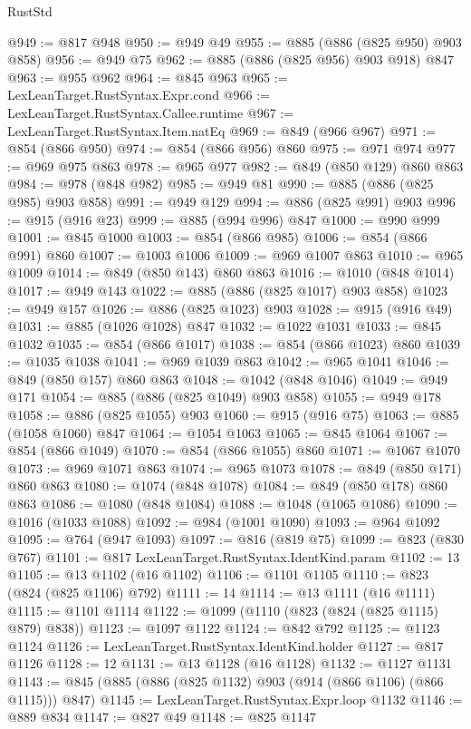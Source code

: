 \begin{lexlean}{RustStd}
\begin{coremodule}
@949 := @817 @948
@950 := @949 @49
@955 := @885 (@886 (@825 @950) @903 @858)
@956 := @949 @75
@962 := @885 (@886 (@825 @956) @903 @918) @847
@963 := @955 @962
@964 := @845 @963
@965 := LexLeanTarget.RustSyntax.Expr.cond
@966 := LexLeanTarget.RustSyntax.Callee.runtime
@967 := LexLeanTarget.RustSyntax.Item.natEq
@969 := @849 (@966 @967)
@971 := @854 (@866 @950)
@974 := @854 (@866 @956) @860
@975 := @971 @974
@977 := @969 @975 @863
@978 := @965 @977
@982 := @849 (@850 @129) @860 @863
@984 := @978 (@848 @982)
@985 := @949 @81
@990 := @885 (@886 (@825 @985) @903 @858)
@991 := @949 @129
@994 := @886 (@825 @991) @903
@996 := @915 (@916 @23)
@999 := @885 (@994 @996) @847
@1000 := @990 @999
@1001 := @845 @1000
@1003 := @854 (@866 @985)
@1006 := @854 (@866 @991) @860
@1007 := @1003 @1006
@1009 := @969 @1007 @863
@1010 := @965 @1009
@1014 := @849 (@850 @143) @860 @863
@1016 := @1010 (@848 @1014)
@1017 := @949 @143
@1022 := @885 (@886 (@825 @1017) @903 @858)
@1023 := @949 @157
@1026 := @886 (@825 @1023) @903
@1028 := @915 (@916 @49)
@1031 := @885 (@1026 @1028) @847
@1032 := @1022 @1031
@1033 := @845 @1032
@1035 := @854 (@866 @1017)
@1038 := @854 (@866 @1023) @860
@1039 := @1035 @1038
@1041 := @969 @1039 @863
@1042 := @965 @1041
@1046 := @849 (@850 @157) @860 @863
@1048 := @1042 (@848 @1046)
@1049 := @949 @171
@1054 := @885 (@886 (@825 @1049) @903 @858)
@1055 := @949 @178
@1058 := @886 (@825 @1055) @903
@1060 := @915 (@916 @75)
@1063 := @885 (@1058 @1060) @847
@1064 := @1054 @1063
@1065 := @845 @1064
@1067 := @854 (@866 @1049)
@1070 := @854 (@866 @1055) @860
@1071 := @1067 @1070
@1073 := @969 @1071 @863
@1074 := @965 @1073
@1078 := @849 (@850 @171) @860 @863
@1080 := @1074 (@848 @1078)
@1084 := @849 (@850 @178) @860 @863
@1086 := @1080 (@848 @1084)
@1088 := @1048 (@1065 @1086)
@1090 := @1016 (@1033 @1088)
@1092 := @984 (@1001 @1090)
@1093 := @964 @1092
@1095 := @764 (@947 @1093)
@1097 := @816 (@819 @75)
@1099 := @823 (@830 @767)
@1101 := @817 LexLeanTarget.RustSyntax.IdentKind.param
@1102 := 13
@1105 := @13 @1102 (@16 @1102)
@1106 := @1101 @1105
@1110 := @823 (@824 (@825 @1106) @792)
@1111 := 14
@1114 := @13 @1111 (@16 @1111)
@1115 := @1101 @1114
@1122 := @1099 (@1110 (@823 (@824 (@825 @1115) @879) @838))
@1123 := @1097 @1122
@1124 := @842 @792
@1125 := @1123 @1124
@1126 := LexLeanTarget.RustSyntax.IdentKind.holder
@1127 := @817 @1126
@1128 := 12
@1131 := @13 @1128 (@16 @1128)
@1132 := @1127 @1131
@1143 := @845 (@885 (@886 (@825 @1132) @903 (@914 (@866 @1106) (@866 @1115))) @847)
@1145 := LexLeanTarget.RustSyntax.Expr.loop @1132
@1146 := @889 @834
@1147 := @827 @49
@1148 := @825 @1147

\end{coremodule}
\end{lexlean}
